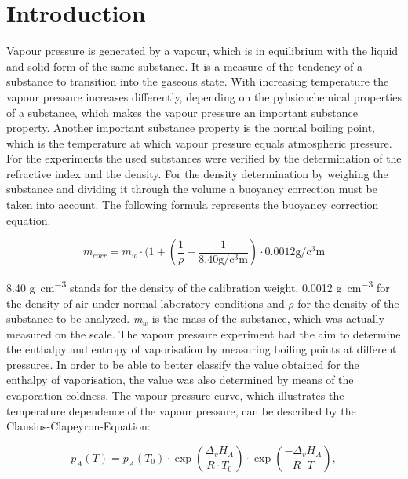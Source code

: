 \documentclass[a4paper,abstracton]{article}	                       %
\renewcommand{\cite}{\supercite}						%
\begin{document}
\section*{Introduction}
Vapour pressure is generated by a vapour, which is in equilibrium with the liquid and solid form of the same substance. It is a measure of the tendency of a substance to transition into the gaseous state\cite{def}. With increasing temperature the vapour pressure increases differently, depending on the pyhsicochemical properties of a substance, which makes the vapour pressure an important substance property. Another important substance property is the normal boiling point, which is the temperature at which vapour pressure equals atmospheric pressure\cite{bp}. 
\singlespacing
For the experiments the used substances were verified by the determination of the refractive index and the density.
For the density determination by weighing the substance and dividing it through the volume a buoyancy correction must be taken into account. The following formula represents the buoyancy correction equation\cite{buyancy}.

\begin{equation}\label{eq:buoyancy}
   {m_{\textit{corr}}} = m_{\textit{w}} \cdot (1 + (\frac{1}{\rho} - \frac{1}{8.40  \si{\gram\per\cubic\centi\metre}}) \cdot 0.0012  \si{\gram\per\cubic\centi\metre}
\end{equation}

8.40 \si{\gram\per\cubic\centi\metre} stands for the density of the calibration weight, 0.0012 \si{\gram\per\cubic\centi\metre} for the density of air under normal laboratory conditions and $\rho$ for the density of the substance to be analyzed. \textit{m$_{\textit{w}}$} is the mass of the substance, which was actually measured on the scale. 
\singlespacing
The vapour pressure experiment had the aim to determine the enthalpy and entropy of vaporisation by measuring boiling points at different pressures. In order to be able to better classify the value obtained for the enthalpy of vaporisation, the value was also determined by means of the evaporation coldness. 
\singlespacing
The vapour pressure curve, which illustrates the temperature dependence of the vapour pressure, can be described by the Clausius-Clapeyron-Equation:

\begin{equation}\label{eq:claus1}
   {p_{\textit{A}}(T)} = p_{\textit{A}}(T_{0}) \cdot \exp(\frac{\Delta_{\textit{v}}H_{A}}{R \cdot T_{0}}) \cdot \exp(\frac{-\Delta_{\textit{v}}H_{A}}{R \cdot T}),
\end{equation}
\end{document}
